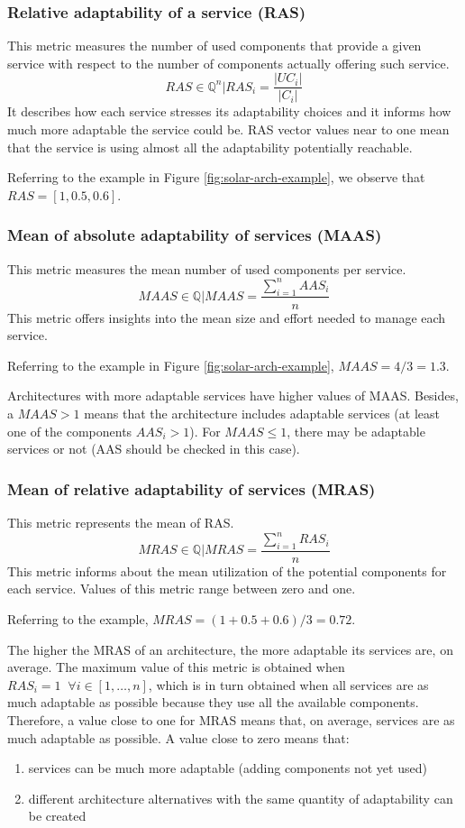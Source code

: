 \subsubsection{Relative adaptability of a service (RAS)}
This metric measures the number of used components that provide a given service with respect to the number of components actually offering such service.
\[ RAS \in \mathbb{Q}^n | RAS_i = \frac{|UC_i|}{|C_i|} \]
It describes how each service stresses its adaptability choices and it informs how much more adaptable the service could be. RAS vector values near to one mean that the service is using almost all the adaptability potentially reachable. 

Referring to the example in Figure \ref{fig:solar-arch-example}, we observe that $RAS = [1, 0.5, 0.6]$.

\subsubsection{Mean	of absolute adaptability of services (MAAS)}
This metric measures the mean number of used components per service.
\[ MAAS \in \mathbb{Q} | MAAS = \frac{\sum_{i=1}^{n} AAS_i}{n}  \]
This metric offers insights into the mean size and effort needed to manage each service.

Referring to the example in Figure \ref{fig:solar-arch-example}, $MAAS = 4/3 = 1.3$. 

Architectures with more adaptable services have higher values of MAAS. Besides, a $MAAS > 1$ means that the architecture includes adaptable services (at least one of the components $AAS_i > 1$). For $MAAS \le 1$, there may be adaptable services or not (AAS should be checked in this case).

\subsubsection{Mean of relative adaptability of services (MRAS)}
This metric represents the mean of RAS.
\[ MRAS \in \mathbb{Q} | MRAS = \frac{\sum_{i=1}^{n}RAS_i}{n}\]
This metric informs about the mean utilization of the potential components for each service. Values of this metric range between zero and one.

Referring to the example, $MRAS = (1 + 0.5 + 0.6)/3 = 0.72$.

The higher the MRAS of an architecture, the more adaptable its services are, on average. The maximum value of this metric is obtained when $RAS_i = 1 \;\;\forall i \in [1, \dots, n]$, which is in turn obtained when all services are as much adaptable as possible because they use all the available components. Therefore, a value close to one for MRAS means that, on average, services are as much adaptable as possible. A value close to zero means that: 
\begin{enumerate}
	\item services can be much more adaptable (adding components not yet used)
	\item different architecture alternatives with the same quantity of adaptability can be created
\end{enumerate}

